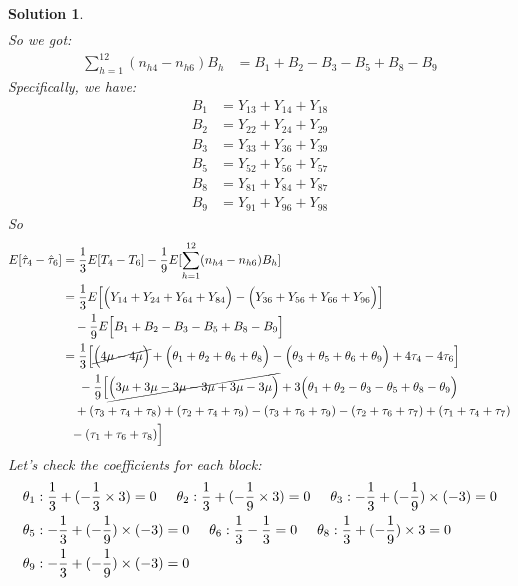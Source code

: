 \documentclass[11pt]{article}
\newtheorem{sol}{Solution}
\begin{document}
\begin{sol}
\begin{align*}
\end{align*}
So we got:
\begin{align*}
	\sum_{h = 1}^{12}(n_{h4} - n_{h6})B_h &= B_1 + B_2 - B_3 - B_5 + B_8 - B_9
\end{align*}
Specifically, we have:
\begin{align*}
	 B_1 &= Y_{13} + Y_{14} + Y_{18}\\
	 B_2 &= Y_{22} + Y_{24} + Y_{29}\\
	 B_3 &= Y_{33} + Y_{36} + Y_{39}\\
	 B_5 &= Y_{52} + Y_{56} + Y_{57}\\
	 B_8 &= Y_{81} + Y_{84} + Y_{87}\\
	 B_9 &= Y_{91} + Y_{96} + Y_{98}
 \end{align*}
 So 
 \begin{align*}
 	E[\hat{\tau}_4 - \hat{\tau}_6] &= \frac{1}{3}E[T_4 - T_6] - \frac{1}{9}E[\sum_{h = 1}^{12}(n_{h4} - n_{h6})B_h]\\
 	&= \frac{1}{3}E\Big[\Big(Y_{14} + Y_{24} + Y_{64} + Y_{84}\Big) - \Big(Y_{36} + Y_{56} + Y_{66} + Y_{96}\Big)\Big]\\
 	&\ \ \ - \frac{1}{9}E\Big[B_1 + B_2 - B_3 - B_5 + B_8- B_9\Big]
\\
 &= \frac{1}{3}\Big[\cancel{\Big(4\mu - 4\mu\Big)}+ \Big(\theta_1 + \theta_2 + \theta_6 + \theta_8\Big) - \Big(\theta_3 + \theta_5 + \theta_6 + \theta_9\Big) + 4\tau_4 - 4\tau_6\Big]\\
&\ \ \ \ - \frac{1}{9}\Big[\cancel{\Big(3\mu + 3\mu - 3\mu - 3\mu + 3\mu - 3\mu\Big)} 
+ 3\Big(\theta_1 + \theta_2 - \theta_3 - \theta_5 + \theta_8 - \theta_9\Big)\\
 &\ \ \ + (\tau_3 + \tau_4 + \tau_8) + (\tau_2 + \tau_4 + \tau_9) - (\tau_3 + \tau_6 + \tau_9) - (\tau_2 + \tau_6 + \tau_7) + (\tau_1 + \tau_4 + \tau_7) \\
 &\ \ - (\tau_1 + \tau_6 + \tau_8)\Big]\\
  \end{align*}
  Let's check the coefficients for each block:
  \begin{align*}
  &\theta_1: \frac{1}{3} + (-\frac{1}{3}\times 3) = 0\hskip 5mm \theta_2: \frac{1}{3} + (-\frac{1}{9} \times 3) = 0 \hskip 5mm \theta_3: -\frac{1}{3} + (-\frac{1}{9})\times (-3) = 0\\
  &\theta_5: -\frac{1}{3} + (-\frac{1}{9}) \times (-3) = 0 \hskip 5mm \theta_6: \frac{1}{3} - \frac{1}{3} = 0 \hskip 5mm \theta_8: \frac{1}{3} + (-\frac{1}{9})\times 3 = 0\\
  &\theta_9: -\frac{1}{3} + (-\frac{1}{9}) \times (-3) = 0

\end{align*}
\end{sol}
\end{document}
